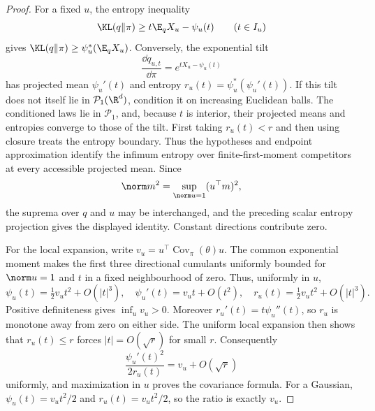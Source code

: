 \documentclass[../main.tex]{subfiles}
\begin{document}
\begin{proof}
For a fixed $u$, the entropy inequality
\[
 \KL(q\|\pi)\ge t\E_qX_u-\psi_u(t)\qquad(t\in I_u)
\]
gives $\KL(q\|\pi)\ge\psi_u^*(\E_qX_u)$. Conversely, the exponential tilt
\[
 \frac{\dd q_{u,t}}{\dd\pi}=e^{tX_u-\psi_u(t)}
\]
has projected mean $\psi_u'(t)$ and entropy
$r_u(t)=\psi_u^*(\psi_u'(t))$. If this tilt does not itself lie in $\mathcal P_1(\R^d)$,
condition it on increasing Euclidean balls. The conditioned laws lie in $\mathcal P_1$, and,
because $t$ is interior, their projected means and entropies converge to those of the tilt.
First taking $r_u(t)<r$ and then using closure treats the entropy boundary. Thus the hypotheses
and endpoint approximation identify the infimum entropy over finite-first-moment competitors at
every accessible projected mean. Since
\[
 \norm m^2=\sup_{\norm u=1}(u^\top m)^2,
\]
the suprema over $q$ and $u$ may be interchanged, and the preceding scalar entropy projection
gives the displayed identity. Constant directions contribute zero.

For the local expansion, write
$v_u=u^\top\operatorname{Cov}_\pi(\theta)u$. The common exponential moment makes the first
three directional cumulants uniformly bounded for $\norm u=1$ and $t$ in a fixed neighbourhood
of zero. Thus, uniformly in $u$,
\[
 \psi_u(t)=\tfrac12v_ut^2+O(|t|^3),\quad
 \psi_u'(t)=v_ut+O(t^2),\quad
 r_u(t)=\tfrac12v_ut^2+O(|t|^3).
\]
Positive definiteness gives $\inf_u v_u>0$. Moreover
$r_u'(t)=t\psi_u''(t)$, so $r_u$ is monotone away from zero on either side. The uniform local
expansion then shows that $r_u(t)\le r$ forces $|t|=O(\sqrt r)$ for small $r$. Consequently
\[
 \frac{\psi_u'(t)^2}{2r_u(t)}=v_u+O(\sqrt r)
\]
uniformly, and maximization in $u$ proves the covariance formula. For a Gaussian,
$\psi_u(t)=v_ut^2/2$ and $r_u(t)=v_ut^2/2$, so the ratio is exactly $v_u$.
\end{proof}
\end{document}
